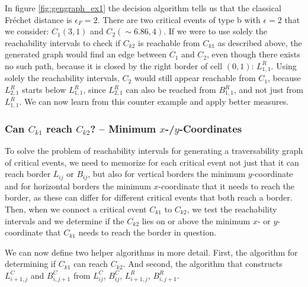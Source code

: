 In figure \ref{fig:gengraph_ex1} the decision algorithm tells us that the classical Fréchet distance is $\epsilon_F = 2$. There are two critical events of type b with $\epsilon = 2$ that we consider: $C_1(3, 1)$ and $C_2(\sim6.86, 4)$. If we were to use solely the reachability intervals to check if $C_{k2}$ is reachable from $C_{k1}$ as described above, the generated graph would find an edge between $C_1$ and $C_2$, even though there exists no such path, because it is closed by the right border of cell $(0, 1)$: $L_{1, 1}^R$. Using solely the reachability intervals, $C_2$ would still appear reachable from $C_1$, because $L_{2, 1}^R$ starts below $L_{1, 1}^R$, since $L_{2, 1}^R$ can also be reached from $B_{1,1}^R$, and not just from $L_{1, 1}^R$. We can now learn from this counter example and apply better measures.

\subsubsection{Can $C_{k1}$ reach $C_{k2}$? – Minimum $x$-/$y$-Coordinates}

To solve the problem of reachability intervals for generating a traversability graph of critical events, we need to memorize for each critical event not just that it can reach border $L_{ij}$ or $B_{ij}$, but also for vertical borders the minimum $y$-coordinate and for horizontal borders the minimum $x$-coordinate that it needs to reach the border, as these can differ for different critical events that both reach a border. Then, when we connect a critical event $C_{k1}$ to $C_{k2}$, we test the reachability intervals and we determine if the $C_{k2}$ lies on or above the minimum $x$- or $y$-coordinate that $C_{k1}$ needs to reach the border in question.

We can now define two helper algorithms in more detail. First, the algorithm for determining if $C_{k1}$ can reach $C_{k2}$. And second, the algorithm that constructs $L_{i+1, j}^C$ and $B_{i, j+1}^C$ from $L_{ij}^C$, $B_{ij}^C$, $L_{i+1, j}^R$, $B_{i, j+1}^R$.

